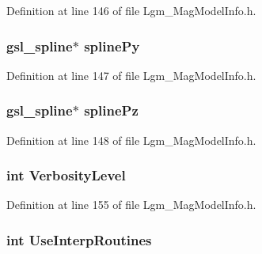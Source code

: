 Definition at line 146 of file Lgm\_\-MagModelInfo.h.\hypertarget{struct_lgm___mag_model_info_1122f71b0439cefad84c3d362409af9e}{
\subsubsection[{splinePy}]{\setlength{\rightskip}{0pt plus 5cm}gsl\_\-spline$\ast$ {\bf splinePy}}}
\label{struct_lgm___mag_model_info_1122f71b0439cefad84c3d362409af9e}




Definition at line 147 of file Lgm\_\-MagModelInfo.h.\hypertarget{struct_lgm___mag_model_info_5463eef92d8b039ea695f0666c59c69f}{
\subsubsection[{splinePz}]{\setlength{\rightskip}{0pt plus 5cm}gsl\_\-spline$\ast$ {\bf splinePz}}}
\label{struct_lgm___mag_model_info_5463eef92d8b039ea695f0666c59c69f}




Definition at line 148 of file Lgm\_\-MagModelInfo.h.\hypertarget{struct_lgm___mag_model_info_ef3011234df74566b679b46e01273bb7}{
\subsubsection[{VerbosityLevel}]{\setlength{\rightskip}{0pt plus 5cm}int {\bf VerbosityLevel}}}
\label{struct_lgm___mag_model_info_ef3011234df74566b679b46e01273bb7}




Definition at line 155 of file Lgm\_\-MagModelInfo.h.\hypertarget{struct_lgm___mag_model_info_beeccfbf7295d0c631353a9159972a74}{
\subsubsection[{UseInterpRoutines}]{\setlength{\rightskip}{0pt plus 5cm}int {\bf UseInterpRoutines}}}
\label{struct_lgm___mag_model_info_beeccfbf7295d0c631353a9159972a74}




